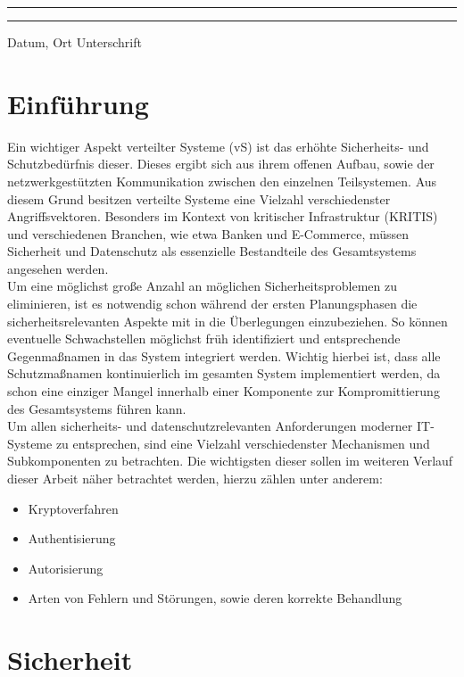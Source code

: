 \documentclass[12pt,a4paper,parskip=half]{scrreprt}
\begin{document}
		\vfill
		\noindent\rule{5cm}{.4pt}\hfill\rule{5cm}{.4pt}\par
		\noindent Datum, Ort \hfill Unterschrift 
		
	\tableofcontents
	
	\chapter{Einführung}
		
		Ein wichtiger Aspekt verteilter Systeme (vS) ist das erhöhte Sicherheits- und Schutzbedürfnis dieser. Dieses ergibt sich aus ihrem offenen Aufbau, sowie der netzwerkgestützten Kommunikation zwischen den einzelnen Teilsystemen. Aus diesem Grund besitzen verteilte Systeme eine Vielzahl verschiedenster Angriffsvektoren. Besonders im Kontext von kritischer Infrastruktur (KRITIS) und verschiedenen Branchen, wie etwa Banken und E-Commerce, müssen Sicherheit und Datenschutz als essenzielle Bestandteile des Gesamtsystems angesehen werden. \\
		Um eine möglichst große Anzahl an möglichen Sicherheitsproblemen zu eliminieren, ist es notwendig schon während der ersten Planungsphasen die sicherheitsrelevanten Aspekte mit in die Überlegungen einzubeziehen. So können eventuelle Schwachstellen möglichst früh identifiziert und entsprechende Gegenmaßnamen in das System integriert werden. Wichtig hierbei ist, dass alle Schutzmaßnamen kontinuierlich im gesamten System implementiert werden, da schon eine einziger Mangel innerhalb einer Komponente zur Kompromittierung des Gesamtsystems führen kann. \\
		Um allen sicherheits- und datenschutzrelevanten Anforderungen moderner IT-Systeme zu entsprechen, sind eine Vielzahl verschiedenster Mechanismen und Subkomponenten zu betrachten. Die wichtigsten dieser sollen im weiteren Verlauf dieser Arbeit näher betrachtet werden, hierzu zählen unter anderem:
		
		\begin{itemize}
			\item Kryptoverfahren
			\item Authentisierung
			\item Autorisierung
			\item Arten von Fehlern und Störungen, sowie deren korrekte Behandlung
		\end{itemize}
		
		
	\chapter{Sicherheit}
		
\end{document}
